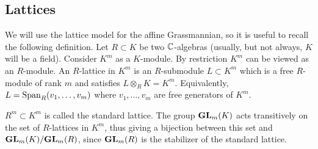 \documentclass[draft]{article}
\begin{document}
\subsection{Lattices}
\label{ss:lat}
We will use the lattice model for the affine Grassmannian, so it is useful to recall the following definition. Let $ R \subset K$ be two $\mathbb C$-algebras (usually, but not always, $K$ will be a field). 
Consider $ K^m $ as a $K$-module.  By restriction $ K^m$ can be viewed as an $R$-module.  An $R$-lattice in $K^m$ 
is an $R$-submodule $ L \subset K^m$ 
which is a free $R$-module of rank $ m $ and satisfies $ L \otimes_R K = K^m $. Equivalently, $ L = \operatorname{Span}_R(v_1, \dots, v_m)$ where $v_1, \dots, v_m$ are free generators of $K^m$. 
% 
\begin{comment}
\jcom{Maybe need that both $K$ and $R$ are integral domains and have the same field of fractions?} 
\acom{Roger has proved that what is written is ok.}
\rcom{Here's my argument: If $L \subset K^m$ is a free rank $m$ $R$-module and $L \otimes K = K^m$, then it's clear we that $L$ is generated by $m$ generators $v_1,\dots,v_m$ over $R$. Since $L\otimes K = K^m$, these also generate $K^m$ over $K$. Then we have a surjective map $K^m \twoheadrightarrow K^m$ given by sending a basis of $K^m$ to the generators $v_1,\dots,v_m$. Since any surjective endomorphism of finite $K$-modules is injective, the $v_1,\dots,v_m$ form a basis. I think the only thing that is needed is that the rings are commutative.}
\jcom{Great.}
\end{comment} 

$ R^m \subset K^m $ is called the standard lattice. 
The group ${\mathbf{GL}}_m(K) $ acts transitively on the set of $R$-lattices in $K^m$, thus giving a bijection between 
this set and ${\mathbf{GL}}_m(K)/{\mathbf{GL}}_m(R)$, since $ {\mathbf{GL}}_m(R) $ is the stabilizer of the standard lattice. 
\end{document}

